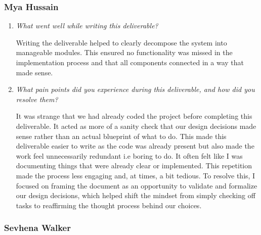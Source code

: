 \documentclass[12pt, titlepage]{article}
\begin{document}
\subsubsection*{Mya Hussain}

\begin{enumerate}
  \item \textit{What went well while writing this deliverable? }
  
  Writing the deliverable helped to clearly decompose the system into manageable modules.
  This ensured no functionality was missed in the implementation process and that all 
  components connected in a way that made sense. 

  \item \textit{What pain points did you experience during this deliverable, and how did you resolve them?}

  It was strange that we had already coded the project before completing this deliverable.
  It acted as more of a sanity check that our design decisions made sense rather than 
  an actual blueprint of what to do. This made this deliverable easier to write as 
  the code was already present but also made the work feel unnecessarily redundant i.e boring to do.
  It often felt like I was documenting things that were already clear or implemented. 
  This repetition made the process less engaging and, at times, a bit tedious. 
  To resolve this, I focused on framing the document as an opportunity to validate 
  and formalize our design decisions, which helped shift the mindset from simply 
  checking off tasks to reaffirming the thought process behind our choices.
    
\end{enumerate}

\subsubsection*{Sevhena Walker}
\end{document}
